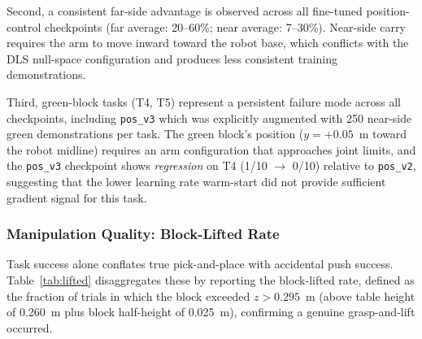 Second, a consistent far-side advantage is observed across all fine-tuned
position-control checkpoints (far average: 20--60\%; near average: 7--30\%).
Near-side carry requires the arm to move inward toward the robot base, which
conflicts with the DLS null-space configuration and produces less consistent
training demonstrations.

Third, green-block tasks (T4, T5) represent a persistent failure mode across
all checkpoints, including \texttt{pos\_v3} which was explicitly augmented with
250 near-side green demonstrations per task.
The green block's position ($y = +0.05$~m toward the robot midline) requires
an arm configuration that approaches joint limits, and the \texttt{pos\_v3}
checkpoint shows \emph{regression} on T4 (1/10 $\to$ 0/10) relative to
\texttt{pos\_v2}, suggesting that the lower learning rate warm-start did not
provide sufficient gradient signal for this task.

\subsubsection{Manipulation Quality: Block-Lifted Rate}

Task success alone conflates true pick-and-place with accidental push success.
Table~\ref{tab:lifted} disaggregates these by reporting the block-lifted rate,
defined as the fraction of trials in which the block exceeded $z > 0.295$~m
(above table height of 0.260~m plus block half-height of 0.025~m),
confirming a genuine grasp-and-lift occurred.

